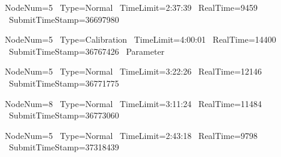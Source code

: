 \begin{description}
\item[] NodeNum=5 \ Type=Normal \ TimeLimit=2:37:39 \ RealTime=9459 \ SubmitTimeStamp=36697980

\item[] NodeNum=5 \ Type=Calibration \ TimeLimit=4:00:01 \ RealTime=14400 \ SubmitTimeStamp=36767426 \ Parameter

\item[] NodeNum=5 \ Type=Normal \ TimeLimit=3:22:26 \ RealTime=12146 \ SubmitTimeStamp=36771775

\item[] NodeNum=8 \ Type=Normal \ TimeLimit=3:11:24 \ RealTime=11484 \ SubmitTimeStamp=36773060

\item[] NodeNum=5 \ Type=Normal \ TimeLimit=2:43:18 \ RealTime=9798 \ SubmitTimeStamp=37318439
\end{description}
